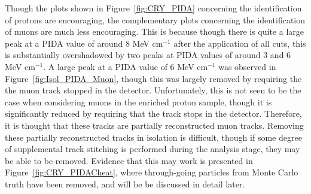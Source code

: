 Though the plots shown in Figure~\ref{fig:CRY_PIDA} concerning the identification of protons are encouraging, the complementary plots concerning the identification of muons are much less encouraging. This is because though there is quite a large peak at a PIDA value of around 8 MeV cm$^{-1}$ after the application of all cuts, this is substantially overshadowed by two peaks at PIDA values of around 3 and 6 MeV cm$^{-1}$. A large peak at a PIDA value of 6 MeV cm$^{-1}$ was observed in Figure~\ref{fig:Isol_PIDA_Muon}, though this was largely removed by requiring the the muon track stopped in the detector. Unfortunately, this is not seen to be the case when considering muons in the enriched proton sample, though it is significantly reduced by requiring that the track stops in the detector. Therefore, it is thought that these tracks are partially reconstructed muon tracks. Removing these partially reconstructed tracks in isolation is difficult, though if some degree of supplemental track stitching is performed during the analysis stage, they may be able to be removed. Evidence that this may work is presented in Figure~\ref{fig:CRY_PIDACheat}, where through-going particles from Monte Carlo truth have been removed, and will be be discussed in detail later. \\


